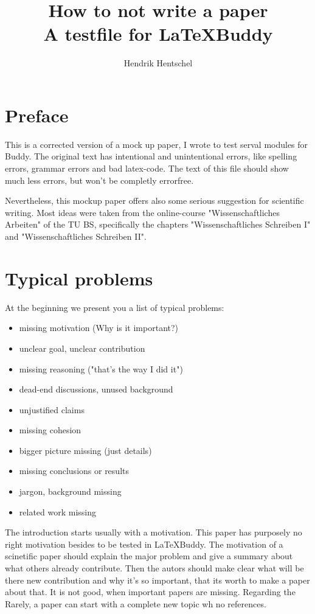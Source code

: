 \documentclass[12pt,a4paper]{article}
\begin{document}
\title{\Large \bf How to not write a paper\\ \Large A testfile for \LaTeX{}Buddy}
\author{Hendrik Hentschel}
\maketitle %
\section*{Preface}
This is a corrected version of a mock up paper, I wrote to test serval modules for \Latex{}Buddy. The original text has intentional and unintentional errors, like spelling errors, grammar errors and bad latex-code. The text of this file should show much less errors, but won't be completly errorfree. 

Nevertheless, this mockup paper offers also some serious suggestion for scientific writing. Most ideas were taken from the online-course "Wissenschaftliches Arbeiten" of the TU BS, specifically the chapters "Wissenschaftliches Schreiben I" and "Wissenschaftliches Schreiben II".

\section{Typical problems}
At the beginning we present you a list of typical problems:
\begin{itemize}
    \item missing motivation (Why is it important?)
    \item unclear goal, unclear contribution
    \item missing reasoning ("that's the way I did it")
    \item dead-end discussions, unused background
    \item unjustified claims
    \item missing cohesion
    \item bigger picture missing (just details)
    \item missing conclusions or results
    \item jargon, background missing
    \item related work missing
\end{itemize}

The introduction starts usually with a motivation. This paper has purposely no right motivation besides to be tested in \LaTeX{}Buddy. The motivation of a scinetific paper should explain the major problem and give a summary about what others already contribute. Then the autors should make clear what will be there new contribution and why it's so important, that its worth to make a paper about that.
It is not good, when important papers are missing. Regarding the Rarely, a paper can start with a complete new topic wh no references. 
\end{document}
